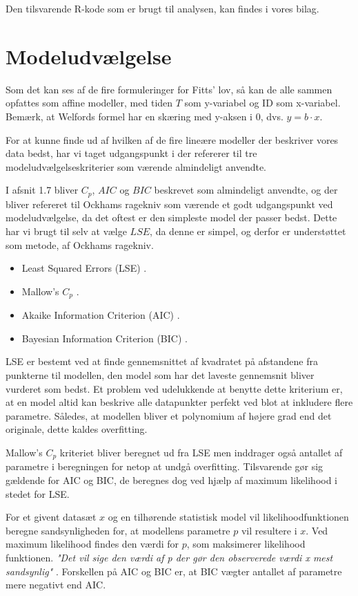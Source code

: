 Den tilsvarende R-kode som er brugt til analysen, kan findes i vores bilag.
\section*{Modeludvælgelse}
Som det kan ses af de fire formuleringer for Fitts' lov, så kan de alle sammen opfattes som affine modeller, med tiden $T$ som y-variabel og ID som x-variabel. Bemærk, at Welfords formel har en skæring med y-aksen i 0, dvs. $y=b\cdot x$.

For at kunne finde ud af hvilken af de fire lineære modeller der beskriver vores data bedst, har vi taget udgangspunkt i \cite{wu2011experiments} der refererer til tre modeludvælgelseskriterier som værende almindeligt anvendte.

I \cite{wu2011experiments} afsnit 1.7 bliver $C_p$, $AIC$ og $BIC$ beskrevet som almindeligt anvendte, og der bliver refereret til Ockhams ragekniv som værende et godt udgangspunkt ved modeludvælgelse, da det oftest er den simpleste model der passer bedst. Dette har vi brugt til selv at vælge $LSE$, da denne er simpel, og derfor er understøttet som metode, af Ockhams ragekniv.
\begin{itemize}
\item{Least Squared Errors (LSE) \cite{legendre1805}.}
\item{Mallow's $C_p$ \cite{mallow1973}.}
\item{Akaike Information Criterion (AIC) \cite{akaike1973}.}
\item{Bayesian Information Criterion (BIC) \cite{schwarz1978}.}
\end{itemize}
LSE er bestemt ved at finde gennemsnittet af kvadratet på afstandene fra punkterne til modellen, den model som har det laveste gennemsnit bliver vurderet som bedst. Et problem ved udelukkende at benytte dette kriterium er, at en model altid kan beskrive alle datapunkter perfekt ved blot at inkludere flere parametre. Således, at modellen bliver et polynomium af højere grad end det originale, dette kaldes overfitting.

Mallow's $C_p$ kriteriet bliver beregnet ud fra LSE men inddrager også antallet af parametre i beregningen for netop at undgå overfitting. Tilsvarende gør sig gældende for AIC og BIC, de beregnes dog ved hjælp af maximum likelihood i stedet for LSE.

For et givent datasæt $x$ og en tilhørende statistisk model vil likelihoodfunktionen beregne sandsynligheden for, at modellens parametre $p$ vil resultere i $x$. Ved maximum likelihood findes den værdi for  $p$, som maksimerer likelihood funktionen. \textit{"Det vil sige den v{\ae}rdi af  p der gør den observerede v{\ae}rdi x mest sandsynlig"} \cite{ditlevsen2011}. Forskellen på AIC og BIC er, at BIC vægter antallet af parametre mere negativt end AIC.

